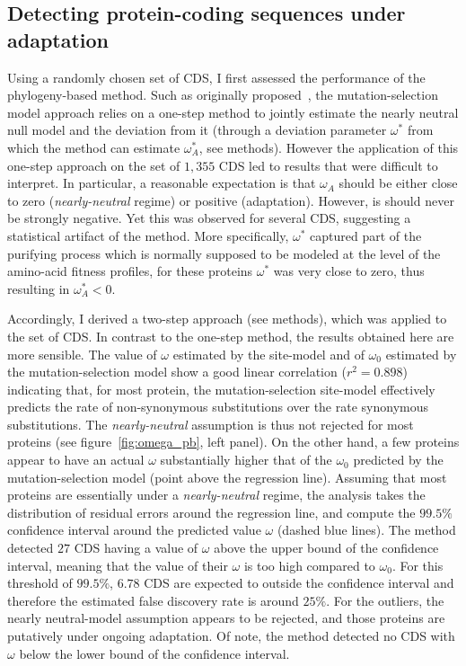\documentclass{article}
\begin{document}
\subsection*{Detecting protein-coding sequences under adaptation}
Using a randomly chosen set of CDS, I first assessed the performance of the phylogeny-based method.
Such as originally proposed~\citep{Rodrigue2016}, the mutation-selection model approach relies on a one-step method to jointly estimate the nearly neutral null model and the deviation from it (through a deviation parameter $\omega^*$ from which the method can estimate $\omega_A^*$, see methods).
However the application of this one-step approach on the set of $1,355$ CDS led to results that were difficult to interpret.
In particular, a reasonable expectation is that $\omega_A$ should be either close to zero (\textit{nearly-neutral} regime) or positive (adaptation).
However, is should never be strongly negative.
Yet this was observed for several CDS, suggesting a statistical artifact of the method.
More specifically, $\omega^*$ captured part of the purifying process which is normally supposed to be modeled at the level of the amino-acid fitness profiles, for these proteins $\omega^*$ was very close to zero, thus resulting in $\omega_A^*<0$.

Accordingly, I derived a two-step approach (see methods), which was applied to the set of CDS.
In contrast to the one-step method, the results obtained here are more sensible.
The value of $\omega$ estimated by the site-model and of $\omega_{0}$ estimated by the mutation-selection model show a good linear correlation ($r^2=0.898$) indicating that, for most protein, the mutation-selection site-model effectively predicts the rate of non-synonymous substitutions over the rate synonymous substitutions.
The \textit{nearly-neutral} assumption is thus not rejected for most proteins (see figure~\ref{fig:omega_pb}, left panel).
On the other hand, a few proteins appear to have an actual $\omega$ substantially higher that of the $\omega_0$ predicted by the mutation-selection model (point above the regression line).
Assuming that most proteins are essentially under a \textit{nearly-neutral} regime, the analysis takes the distribution of residual errors around the regression line, and compute the $99.5\%$ confidence interval around the predicted value $\omega$ (dashed blue lines).
The method detected $27$ CDS having a value of $\omega$ above the upper bound of the confidence interval, meaning that the value of their $\omega$ is too high compared to $\omega_{0}$.
For this threshold of $99.5\%$, $6.78$ CDS are expected to outside the confidence interval and therefore the estimated false discovery rate is around $25 \%$.
For the outliers, the nearly neutral-model assumption appears to be rejected, and those proteins are putatively under ongoing adaptation.
Of note, the method detected no CDS with $\omega$ below the lower bound of the confidence interval.
\end{document}
